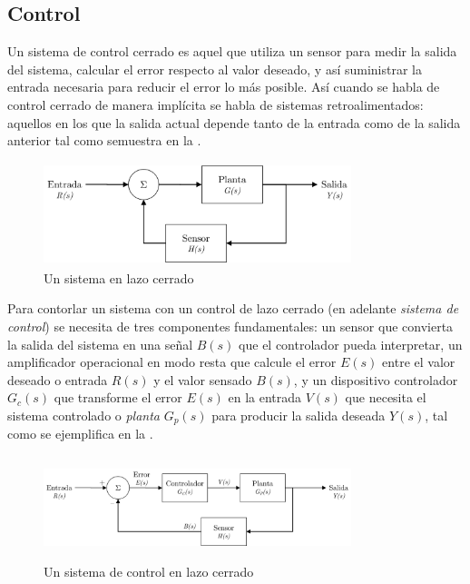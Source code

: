 %
%


\subsection{Control}%
\label{intro-control}

Un sistema de control cerrado es aquel que utiliza un sensor para medir la salida del sistema, calcular el error respecto al valor deseado, y así suministrar la entrada necesaria para reducir el error lo más posible.
Así cuando se habla de control cerrado de manera implícita se habla de sistemas retroalimentados: aquellos en los que la salida actual depende tanto de la entrada como de la salida anterior tal como semuestra en la .

\begin{figure}[H]
	\centering
	\includegraphics[width=0.8\textwidth,height=3cm,keepaspectratio]{img/closed-loop.png}
	\caption{Un sistema en lazo cerrado}%
	\label{fig:closed-loop}
\end{figure}

Para contorlar un sistema con un control de lazo cerrado (en adelante \emph{sistema de control}) se necesita de tres componentes fundamentales: un sensor que convierta la salida del sistema en una señal $B(s)$ que el controlador pueda interpretar, un amplificador operacional en modo resta que calcule el error $E(s)$ entre el valor deseado o entrada $R(s)$ y el valor sensado $B(s)$, y un dispositivo controlador $G_{c}(s)$ que transforme el error $E(s)$ en la entrada $V(s)$ que necesita el sistema controlado o \emph{planta} $G_p(s)$ para producir la salida deseada $Y(s)$, tal como se ejemplifica en la .

\begin{figure}[H]
	\centering
	\includegraphics[width=0.8\textwidth,height=3cm,keepaspectratio]{img/control-loop.png}
	\caption{Un sistema de control en lazo cerrado}%
	\label{fig:control-loop}
\end{figure}

